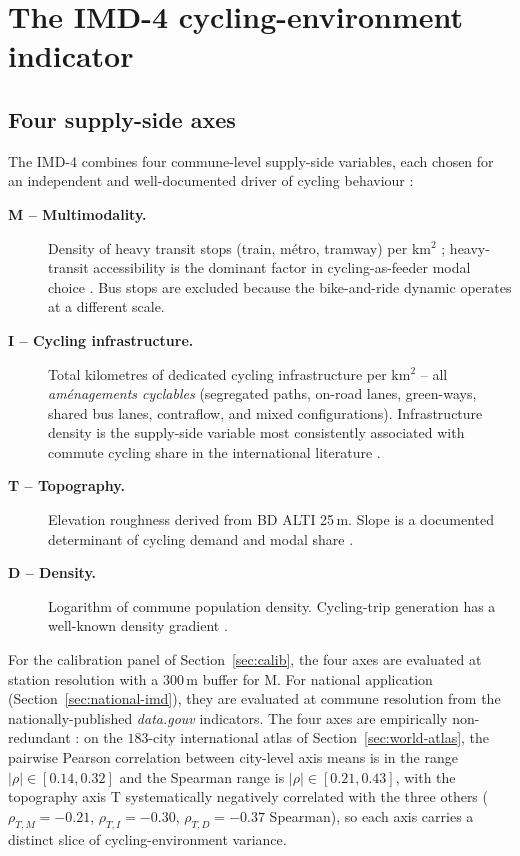 \documentclass[11pt,a4paper]{article}
\begin{document}
\section{The IMD-4 cycling-environment indicator}
\label{sec:imd}

\subsection{Four supply-side axes}
\label{sec:axes}

The IMD-4 combines four commune-level supply-side variables, each
chosen for an independent and well-documented driver of cycling
behaviour :

\begin{description}
    \item[\textbf{M -- Multimodality.}]  Density of heavy transit
          stops (train, m\'etro, tramway) per km$^2$ ;
          heavy-transit accessibility is the dominant factor in
          cycling-as-feeder modal choice
          \citep{Martens2007,Saberi2018}.
          Bus stops are excluded because the bike-and-ride
          dynamic operates at a different scale.

    \item[\textbf{I -- Cycling infrastructure.}]  Total kilometres
          of dedicated cycling infrastructure per km$^2$ -- all
          \emph{am\'enagements cyclables} (segregated paths,
          on-road lanes, green-ways, shared bus lanes, contraflow,
          and mixed configurations).  Infrastructure density is
          the supply-side variable most consistently associated
          with commute cycling share in the international
          literature \citep{Schoner2014,Parkin2008,Heinen2010}.

    \item[\textbf{T -- Topography.}]  Elevation roughness derived
          from BD ALTI 25\,m.  Slope is a documented determinant
          of cycling demand and modal share
          \citep{Parkin2008,Rietveld2004}.

    \item[\textbf{D -- Density.}]  Logarithm of commune population
          density.  Cycling-trip generation has a well-known
          density gradient
          \citep{FaghihImani2014,Rietveld2004}.
\end{description}

For the calibration panel of Section~\ref{sec:calib}, the four
axes are evaluated at station resolution with a $300$\,m buffer
for M.  For national application
(Section~\ref{sec:national-imd}), they are evaluated at commune
resolution from the nationally-published
\emph{data.gouv} indicators.  The four axes are empirically
non-redundant : on the $183$-city international atlas of
Section~\ref{sec:world-atlas}, the pairwise Pearson correlation
between city-level axis means is in the range $|\rho| \in
[0.14, 0.32]$ and the Spearman range is $|\rho| \in [0.21,
0.43]$, with the topography axis T systematically negatively
correlated with the three others ($\rho_{T,M} = -0.21$,
$\rho_{T,I} = -0.30$, $\rho_{T,D} = -0.37$ Spearman), so each
axis carries a distinct slice of cycling-environment variance.
\end{document}
